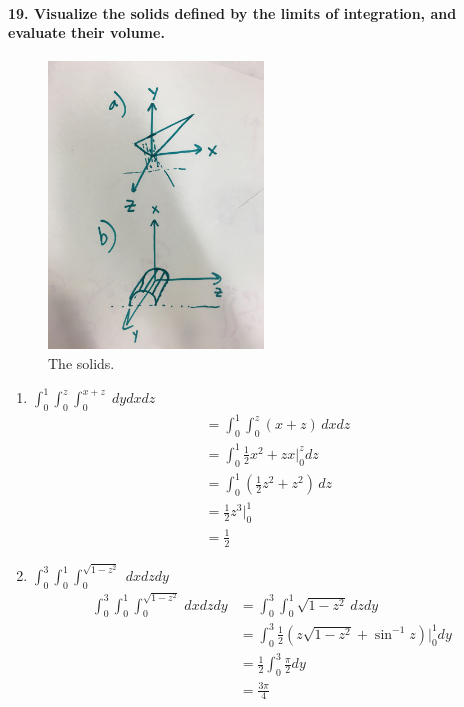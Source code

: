 \documentclass{article}
\begin{document}
\paragraph{19. Visualize the solids defined by the limits of integration, and evaluate their volume.}

\begin{figure}[H]
    \centering
    \includegraphics[height=3in]{regions3.jpg}
    \caption{The solids.}
\end{figure}

\begin{enumerate}
    \item $\int_0^1 \int_0^z \int_0^{x+z} \; dy dx dz$
    \begin{align*}
        &= \int_0^1 \int_0^z (x + z) \, dxdz  \\
        &= \int_0^1 \frac{1}{2}x^2 + zx \Bigr|_{0}^{z} dz \\
        &= \int_0^1 \left(\frac{1}{2}z^2 + z^2\right) \, dz \\
        &= \frac{1}{2} z^3 \Bigr|_{0}^{1} \\
        &= \frac{1}{2}
    \end{align*}
    \item $\int_0^3 \int_0^1 \int_0^{\sqrt{1-z^2}} \; dx dz dy$
    \begin{align*}
        \int_0^3 \int_0^1 \int_0^{\sqrt{1-z^2}} \, dx dz dy &= \int_0^3 \int_0^1 \sqrt{1-z^2} \, dz dy \\
        &= \int_0^3 \frac{1}{2}\left(z\sqrt{1-z^2} + \sin^{-1} z\right)\Bigr|_{0}^{1} dy \\
        &= \frac{1}{2} \int_0^3 \frac{\pi}{2}dy \\
        &= \frac{3\pi}{4}
    \end{align*}
\end{enumerate}
\end{document}

